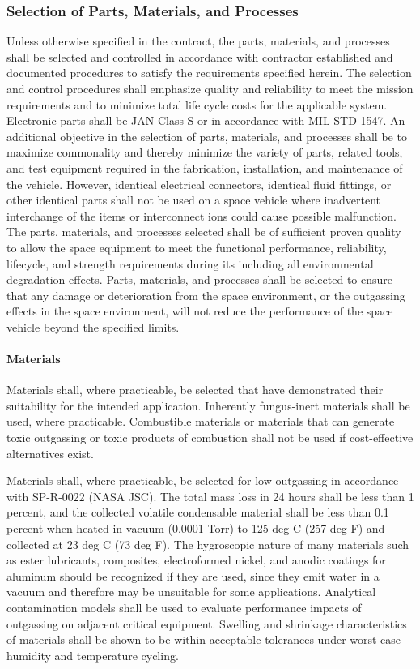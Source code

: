 \documentclass[12pt]{article}
\begin{document}
\subsubsection{Selection of Parts, Materials, and Processes} %
Unless otherwise specified in the contract, the parts, materials, and processes shall be selected and controlled in accordance with contractor established and documented procedures to satisfy the requirements specified herein. 
The selection and control procedures shall emphasize quality and reliability to meet the mission requirements and to minimize total life cycle costs for the applicable system. 
Electronic parts shall be JAN Class S or in accordance with MIL-STD-1547. 
An additional objective in the selection of parts, materials, and processes shall be to maximize commonality and thereby minimize the variety of parts, related tools, and test equipment required in the fabrication, installation, and maintenance of the vehicle.
However, identical electrical connectors, identical fluid fittings, or other identical parts shall not be used on a space vehicle where inadvertent interchange of the items or interconnect ions could cause possible malfunction.
The parts, materials, and processes selected shall be of sufficient proven quality to allow the space equipment to meet the functional performance, reliability, lifecycle, and strength requirements during its including all environmental degradation effects.
Parts, materials, and processes shall be selected to ensure that any damage or deterioration from the space environment, or the outgassing effects in the space environment, will not reduce the performance of the space vehicle beyond the specified limits.

\paragraph{Materials} %
Materials shall, where practicable, be selected that have demonstrated their suitability for the intended application. 
Inherently fungus-inert materials shall be used, where practicable. 
Combustible materials or materials that can generate toxic outgassing or toxic products of combustion shall not be used if cost-effective alternatives exist.

Materials shall, where practicable, be selected for low outgassing in accordance with SP-R-0022 (NASA JSC). 
The total mass loss in 24 hours shall be less than 1 percent, and the collected volatile condensable material shall be less than 0.1 percent when heated in vacuum (0.0001 Torr) to 125 deg C (257 deg F) and collected at 23 deg C (73 deg F). 
The hygroscopic nature of many materials such as ester lubricants, composites, electroformed nickel, and anodic coatings for aluminum should be recognized if they are used, since they emit water in a vacuum and therefore may be unsuitable for some applications.
Analytical contamination models shall be used to evaluate performance impacts of outgassing on adjacent critical equipment. 
Swelling and shrinkage characteristics of materials shall be shown to be within acceptable tolerances under worst case humidity and temperature cycling.
\end{document}
